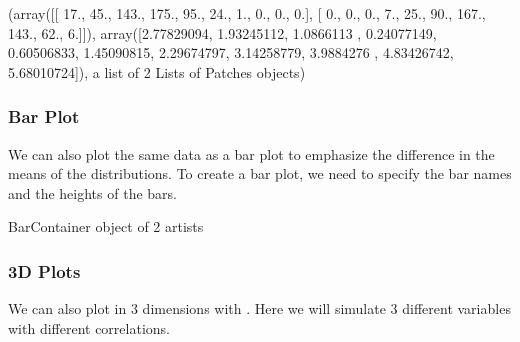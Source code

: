 \documentclass[letterpaper,10pt,english]{sphinxmanual}
\begin{document}
\begin{sphinxVerbatim}[commandchars=\\\{\}]
(array([[ 17.,  45., 143., 175.,  95.,  24.,   1.,   0.,   0.,   0.],
        [  0.,   0.,   0.,   7.,  25.,  90., 167., 143.,  62.,   6.]]),
 array([\PYGZhy{}2.77829094, \PYGZhy{}1.93245112, \PYGZhy{}1.0866113 , \PYGZhy{}0.24077149,  0.60506833,
         1.45090815,  2.29674797,  3.14258779,  3.9884276 ,  4.83426742,
         5.68010724]),
 \PYGZlt{}a list of 2 Lists of Patches objects\PYGZgt{})
\end{sphinxVerbatim}

\noindent{}


\subsubsection{Bar Plot}
\label{\detokenize{content/Introduction_to_Plotting:bar-plot}}
We can also plot the same data as a bar plot to emphasize the difference in the means of the distributions. To create a bar plot, we need to specify the bar names and the heights of the bars.

\begin{sphinxVerbatim}[commandchars=\\\{\}]
\PYG{p}{[}\PYG{p}{]}  
\end{sphinxVerbatim}

\begin{sphinxVerbatim}[commandchars=\\\{\}]
\PYGZlt{}BarContainer object of 2 artists\PYGZgt{}
\end{sphinxVerbatim}

\noindent{}


\subsubsection{3D Plots}
\label{\detokenize{content/Introduction_to_Plotting:d-plots}}
We can also plot in 3 dimensions with . Here we will simulate 3 different variables with different correlations.
\end{document}

